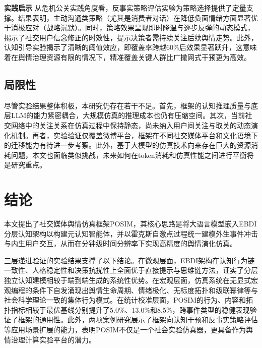 \documentclass[a4paper,fleqn]{cas-sc}
\begin{document}
\textbf{实践启示 }从危机公关实践角度看，反事实策略评估实验为策略选择提供了定量支撑。结果表明，主动沟通类策略（尤其是消费者对话）在降低负面情绪方面显著优于消极应对（战略沉默）。同时，策略效果呈现即时降温与逐步反弹的动态模式，揭示了社交用户信念修正的时效性，提示决策者需持续关注后续舆情走势。此外，认知引导实验揭示了清晰的阈值效应，即覆盖率跨越60\%后效果显著跃升，这意味着在舆情治理资源有限的情况下，精准覆盖关键人群比广撒网式干预更为高效。

\subsection{局限性}

尽管实验结果整体积极，本研究仍存在若干不足。首先，框架的认知推理质量与底层LLM的能力紧密耦合，大规模仿真的推理成本也仍有压缩空间。其次，当前社交网络中的关注关系在仿真过程中保持静态，尚未纳入用户间关注与取关的动态演化机制。再者，实验验证仅覆盖微博平台，框架在不同社交媒体平台和文化语境下的迁移能力有待进一步考察。此外，基于大模型的仿真技术向来存在巨大的资源消耗问题，本文也面临类似挑战，未来如何在token消耗和仿真性能之间进行平衡将是研究重点。

\section{结论}\label{sec:conclusion}

本文提出了社交媒体舆情仿真框架POSIM，其核心思路是将大语言模型嵌入EBDI分层认知架构以构建元认知智能体，并以霍克斯自激点过程统一建模外生事件冲击与内生用户交互，从而在分钟级时间分辨率下实现高精度的舆情演化仿真。

三层递进验证的实验结果支撑了以下结论。在微观层面，EBDI架构在认知行为链一致性、人格稳定性和决策抗扰性上全面优于直接提示与思维链方法，证实了分层独立认知建模相较于端到端生成的系统性优势。在宏观层面，仿真系统在无显式宏观编程的条件下自发涌现出舆情生命周期、情绪极化、无标度拓扑和级联幂律等与社会科学理论一致的集体行为模式。在统计校准层面，POSIM的行为、内容和拓扑指标相较于最优基线分别提升了5.0\%、13.0\%和8.5\%，跨事件类型的稳健表现验证了框架的通用性。此外，两项案例研究展示了框架向认知干预和反事实策略评估等应用场景扩展的能力，表明POSIM不仅是一个社会实验仿真器，更具备作为舆情治理计算实验平台的潜力。



\end{document}
